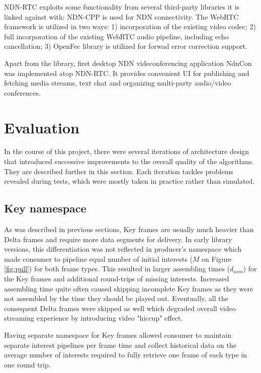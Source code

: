 \documentclass{icn/sig-alternate-2012} %
\newcommand{\ndnrtcName}{NDN-RTC} %
\newcommand{\ndnconName}{NdnCon}
\begin{document}
\ndnrtcName{} exploits some functionality from several third-party libraries it is linked against with: NDN-CPP \cite{ndnccl} is used for NDN connectivity. The WebRTC framework \cite{webrtc} is utilized in two ways: 1) incorporation of the existing video codec; 2) full incorporation of the existing WebRTC audio pipeline, including echo cancellation;  3) OpenFec \cite{openfec} library is utilized for forwad error correction support.

Apart from the library, first desktop NDN videconferencing application \ndnconName{} \cite{ndncon} was implemented atop \ndnrtcName{}. It provides convenient UI for publishing and fetching media streams, text chat and organizing multi-party audio/video conferences.

\section{Evaluation}
\label{sec:eval} 
In the course of this project, there were several iterations of architecture design that introduced successive improvements to the overall quality of the algorithms. They are described further in this section. Each iteration tackles problems revealed during tests, which were mostly taken in practice rather than simulated.

\subsection{Key namespace}
As was described in previous sections, Key frames are usually much heavier than Delta frames and require more data segments for delivery. In early library versions, this differentiation was not reflected in producer's namespace which made consumer to pipeline equal number of initial interests ($M$ on Figure \ref{fig:pull}) for both frame types. This resulted in larger assembling times ($d_{asm}$) for the Key frames and additional round-trips of missing interests. Increased assembling time quite often caused skipping incomplete Key frames as they were not assembled by the time they should be played out. Eventually, all the consequent Delta frames were skipped as well which degraded overall video streaming experience by introducing video "hiccup" effect.

Having separate namespace for Key frames allowed consumer to maintain separate interest pipelines per frame time and collect historical data on the average number of interests required to fully retrieve one frame of each type in one round trip.
\end{document}
